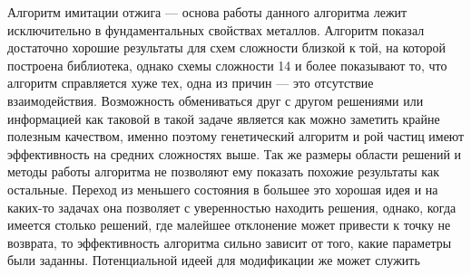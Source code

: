 \documentclass[14pt]{extarticle} %
\begin{document}
Алгоритм имитации отжига --- основа работы данного алгоритма лежит исключительно в фундаментальных свойствах металлов. Алгоритм показал достаточно хорошие результаты для схем сложности близкой к той, на которой построена библиотека, однако схемы сложности 14 и более показывают то, что алгоритм справляется хуже тех, одна из причин — это отсутствие взаимодействия. Возможность обмениваться друг с другом решениями или информацией как таковой в такой задаче является как можно заметить крайне полезным качеством, именно поэтому генетический алгоритм и рой частиц имеют эффективность на средних сложностях выше. Так же размеры области решений и методы работы алгоритма не позволяют ему показать похожие результаты как остальные. Переход из меньшего состояния в большее это хорошая идея и на каких-то задачах она позволяет с уверенностью находить решения, однако, когда имеется столько решений, где малейшее отклонение может привести к точку не возврата, то эффективность алгоритма сильно зависит от того, какие параметры были заданны. Потенциальной идеей для модификации же может служить 
\end{document}
